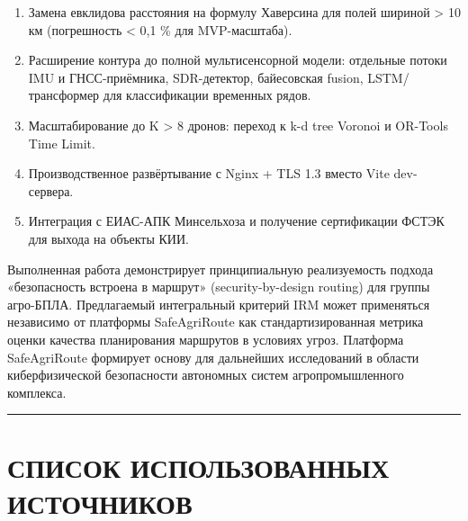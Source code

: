 \begin{enumerate}
\def\labelenumi{\arabic{enumi}.}
\tightlist
\item
  Замена евклидова расстояния на формулу Хаверсина для полей шириной \textgreater{} 10 км (погрешность \textless{} 0,1 \% для MVP-масштаба).
\item
  Расширение контура до полной мультисенсорной модели: отдельные потоки IMU и ГНСС-приёмника, SDR-детектор, байесовская fusion, LSTM/трансформер для классификации временных рядов.
\item
  Масштабирование до K \textgreater{} 8 дронов: переход к k-d tree Voronoi и OR-Tools Time Limit.
\item
  Производственное развёртывание с Nginx + TLS 1.3 вместо Vite dev-сервера.
\item
  Интеграция с ЕИАС-АПК Минсельхоза и получение сертификации ФСТЭК для выхода на объекты КИИ.
\end{enumerate}

Выполненная работа демонстрирует принципиальную реализуемость подхода «безопасность встроена в маршрут» (security-by-design routing) для группы агро-БПЛА. Предлагаемый интегральный критерий IRM может применяться независимо от платформы SafeAgriRoute как стандартизированная метрика оценки качества планирования маршрутов в условиях угроз. Платформа SafeAgriRoute формирует основу для дальнейших исследований в области киберфизической безопасности автономных систем агропромышленного комплекса.

\begin{center}\rule{0.5\linewidth}{0.5pt}\end{center}

\hypertarget{ux441ux43fux438ux441ux43eux43a-ux438ux441ux43fux43eux43bux44cux437ux43eux432ux430ux43dux43dux44bux445-ux438ux441ux442ux43eux447ux43dux438ux43aux43eux432}{%
\section{СПИСОК ИСПОЛЬЗОВАННЫХ ИСТОЧНИКОВ}\label{ux441ux43fux438ux441ux43eux43a-ux438ux441ux43fux43eux43bux44cux437ux43eux432ux430ux43dux43dux44bux445-ux438ux441ux442ux43eux447ux43dux438ux43aux43eux432}}

